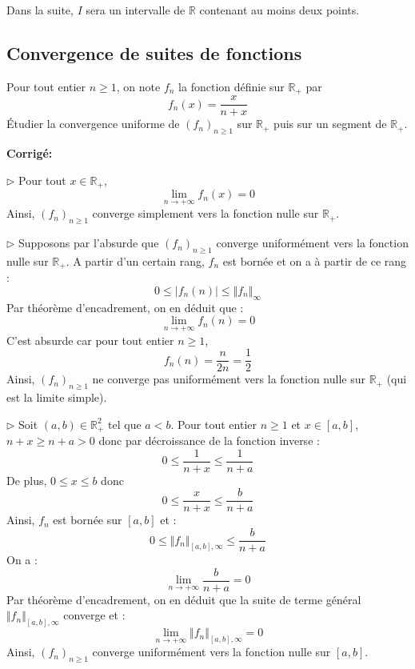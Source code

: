 \documentclass[a4paper,twoside,french,11pt]{VcCours}
\newcommand{\corr}{\textbf{Corrigé:}}
\begin{document}

\tableofcontents
\separationTitre

Dans la suite, $I$ sera un intervalle de $\mathbb{R}$ contenant au moins deux points.

\medskip

\subsection{Convergence de suites de fonctions}

\begin{Exercice}{} Pour tout entier $n \geq 1$, on note $f_n$ la fonction définie sur $\mathbb{R}_+$ par 
$$ f_n(x) = \frac{x}{n+x}$$
Étudier la convergence uniforme de $(f_n)_{n \geq 1}$ sur $\mathbb{R}_+$ puis sur un segment de $\mathbb{R}_+$.
\end{Exercice}

\corr 

$\rhd$ Pour tout $x \in \mathbb{R}_+$,
$$ \lim_{n \rightarrow + \infty} f_n(x) = 0$$
Ainsi, $(f_n)_{n \geq 1}$ converge simplement vers la fonction nulle sur $\mathbb{R}_+$.

\medskip

$\rhd$ Supposons par l'absurde que $(f_n)_{n \geq 1}$ converge uniformément vers la fonction nulle sur $\mathbb{R}_+$. A partir d'un certain rang, $f_n$ est bornée et on a à partir de ce rang :
$$ 0 \leq \vert f_n(n) \vert \leq \Vert f_n \Vert_{\infty}$$
Par théorème d'encadrement, on en déduit que :
$$ \lim_{n \rightarrow + \infty} f_n(n) = 0$$
C'est absurde car pour tout entier $n \geq 1$,
$$ f_n(n) = \dfrac{n}{2n} = \dfrac{1}{2}$$
Ainsi,  $(f_n)_{n \geq 1}$ ne converge pas uniformément vers la fonction nulle sur $\mathbb{R}_+$ (qui est la limite simple).

\medskip

$\rhd$ Soit $(a,b) \in \mathbb{R}_+^2$ tel que $a <b$. Pour tout entier $n \geq 1$ et $x \in [a,b]$, $n+x \geq n+a>0$ donc par décroissance de la fonction inverse :
$$ 0 \leq \dfrac{1}{n+x} \leq \dfrac{1}{n+a}$$
De plus, $0 \leq x \leq b$ donc 
$$ 0 \leq \dfrac{x}{n+x} \leq \dfrac{b}{n+a}$$
Ainsi, $f_n$ est bornée sur $[a,b]$ et :
$$ 0 \leq \Vert f_n \Vert_{[a,b],\infty} \leq \dfrac{b}{n+a}$$
On a :
$$ \lim_{n \rightarrow + \infty}  \dfrac{b}{n+a} = 0$$
Par théorème d'encadrement, on en déduit que la suite de terme général $\Vert f_n \Vert_{[a,b],\infty}$ converge et :
$$ \lim_{n \rightarrow + \infty} \Vert f_n \Vert_{[a,b],\infty} = 0$$
Ainsi, $(f_n)_{n \geq 1}$ converge uniformément vers la fonction nulle sur $[a,b]$.
\end{document}
